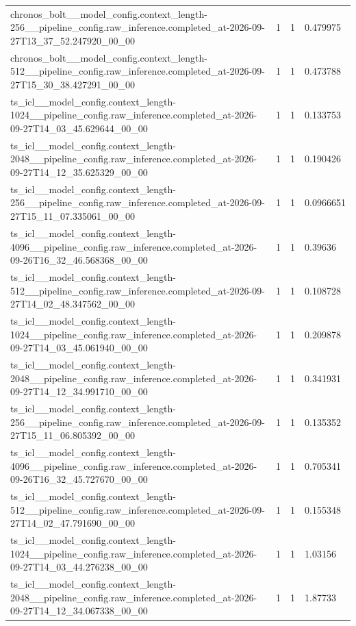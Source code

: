 \begin{tabular}{llll}
chronos\_bolt\_\_model\_config.context\_length-256\_\_pipeline\_config.raw\_inference.completed\_at-2026-09-27T13\_37\_52.247920\_00\_00 & 1 & 1 & 0.479975 \\
chronos\_bolt\_\_model\_config.context\_length-512\_\_pipeline\_config.raw\_inference.completed\_at-2026-09-27T15\_30\_38.427291\_00\_00 & 1 & 1 & 0.473788 \\
ts\_icl\_\_model\_config.context\_length-1024\_\_pipeline\_config.raw\_inference.completed\_at-2026-09-27T14\_03\_45.629644\_00\_00 & 1 & 1 & 0.133753 \\
ts\_icl\_\_model\_config.context\_length-2048\_\_pipeline\_config.raw\_inference.completed\_at-2026-09-27T14\_12\_35.625329\_00\_00 & 1 & 1 & 0.190426 \\
ts\_icl\_\_model\_config.context\_length-256\_\_pipeline\_config.raw\_inference.completed\_at-2026-09-27T15\_11\_07.335061\_00\_00 & 1 & 1 & 0.0966651 \\
ts\_icl\_\_model\_config.context\_length-4096\_\_pipeline\_config.raw\_inference.completed\_at-2026-09-26T16\_32\_46.568368\_00\_00 & 1 & 1 & 0.39636 \\
ts\_icl\_\_model\_config.context\_length-512\_\_pipeline\_config.raw\_inference.completed\_at-2026-09-27T14\_02\_48.347562\_00\_00 & 1 & 1 & 0.108728 \\
ts\_icl\_\_model\_config.context\_length-1024\_\_pipeline\_config.raw\_inference.completed\_at-2026-09-27T14\_03\_45.061940\_00\_00 & 1 & 1 & 0.209878 \\
ts\_icl\_\_model\_config.context\_length-2048\_\_pipeline\_config.raw\_inference.completed\_at-2026-09-27T14\_12\_34.991710\_00\_00 & 1 & 1 & 0.341931 \\
ts\_icl\_\_model\_config.context\_length-256\_\_pipeline\_config.raw\_inference.completed\_at-2026-09-27T15\_11\_06.805392\_00\_00 & 1 & 1 & 0.135352 \\
ts\_icl\_\_model\_config.context\_length-4096\_\_pipeline\_config.raw\_inference.completed\_at-2026-09-26T16\_32\_45.727670\_00\_00 & 1 & 1 & 0.705341 \\
ts\_icl\_\_model\_config.context\_length-512\_\_pipeline\_config.raw\_inference.completed\_at-2026-09-27T14\_02\_47.791690\_00\_00 & 1 & 1 & 0.155348 \\
ts\_icl\_\_model\_config.context\_length-1024\_\_pipeline\_config.raw\_inference.completed\_at-2026-09-27T14\_03\_44.276238\_00\_00 & 1 & 1 & 1.03156 \\
ts\_icl\_\_model\_config.context\_length-2048\_\_pipeline\_config.raw\_inference.completed\_at-2026-09-27T14\_12\_34.067338\_00\_00 & 1 & 1 & 1.87733 \\

\end{tabular}
